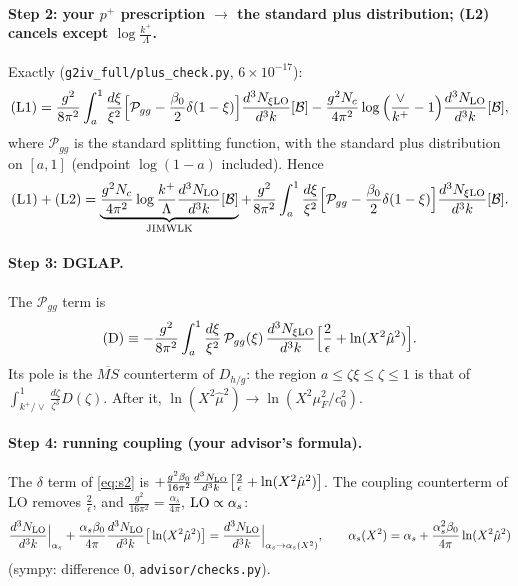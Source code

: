 \documentclass[10pt]{article}
\numberwithin{equation}{section}
\newcommand{\MSb}{\overline{MS}}
\newcommand{\LO}{{\rm LO}}
\begin{document}
\paragraph{Step 2: your $p^+$ prescription $\to$ the standard plus distribution; (L2) cancels except $\log\frac{k^+}{\Lambda}$.} Exactly (\texttt{g2iv\_full/plus\_check.py}, $6\times10^{-17}$):
\begin{equation}
\text{(L1)}=\frac{g^2}{8\pi^2}\int_a^1\frac{d\xi}{\xi^2}\Big[\mathcal P_{gg}-\frac{\beta_0}{2}\delta(1-\xi)\Big]\frac{d^3N_{\xi\rm LO}}{d^3k}[\mathcal B]-\frac{g^2N_c}{4\pi^2}\log\Big(\frac{\vee}{k^+}-1\Big)\frac{d^3N_{\rm LO}}{d^3k}[\mathcal B],
\end{equation}
where $\mathcal P_{gg}$ is the standard splitting function, with the standard plus distribution on $[a,1]$ (endpoint $\log(1-a)$ included). Hence
\begin{equation}
\text{(L1)}+\text{(L2)}=\underbrace{\frac{g^2N_c}{4\pi^2}\log\frac{k^+}{\Lambda}\frac{d^3N_{\rm LO}}{d^3k}[\mathcal B]}_{\rm JIMWLK}+\frac{g^2}{8\pi^2}\int_a^1\frac{d\xi}{\xi^2}\Big[\mathcal P_{gg}-\frac{\beta_0}{2}\delta(1-\xi)\Big]\frac{d^3N_{\xi\rm LO}}{d^3k}[\mathcal B].\label{eq:s2}
\end{equation}

\paragraph{Step 3: DGLAP.} The $\mathcal P_{gg}$ term is
\begin{equation}
{\rm (D)}\equiv-\frac{g^2}{8\pi^2}\int_a^1\frac{d\xi}{\xi^2}\,\mathcal P_{gg}(\xi)\,\frac{d^3N_{\xi\rm LO}}{d^3k}\Big[\frac2\epsilon+\ln(X^2\hat\mu^2)\Big].
\end{equation}
Its pole is the $\MSb$ counterterm of $D_{h/g}$: the region $a\le\zeta\xi\le\zeta\le1$ is that of $\int_{k^+/\vee}^1\frac{d\zeta}{\zeta^3}D(\zeta)$. After it, $\ln(X^2\hat\mu^2)\to\ln(X^2\mu_F^2/c_0^2)$.

\paragraph{Step 4: running coupling (your advisor's formula).} The $\delta$ term of \eqref{eq:s2} is $+\frac{g^2\beta_0}{16\pi^2}\frac{d^3N_{\rm LO}}{d^3k}\big[\frac2\epsilon+\ln(X^2\hat\mu^2)\big]$. The coupling counterterm of LO removes $\frac2\epsilon$, and $\frac{g^2}{16\pi^2}=\frac{\alpha_s}{4\pi}$, $\LO\propto\alpha_s$:
\begin{equation}
\frac{d^3N_{\rm LO}}{d^3k}\Big|_{\alpha_s}+\frac{\alpha_s\beta_0}{4\pi}\frac{d^3N_{\rm LO}}{d^3k}\big[\ln(X^2\hat\mu^2)\big]=\frac{d^3N_{\rm LO}}{d^3k}\Big|_{\alpha_s\to\alpha_s(X^2)},\qquad\alpha_s(X^2)=\alpha_s+\frac{\alpha_s^2\beta_0}{4\pi}\ln(X^2\hat\mu^2)
\end{equation}
(sympy: difference $0$, \texttt{advisor/checks.py}).
\end{document}
